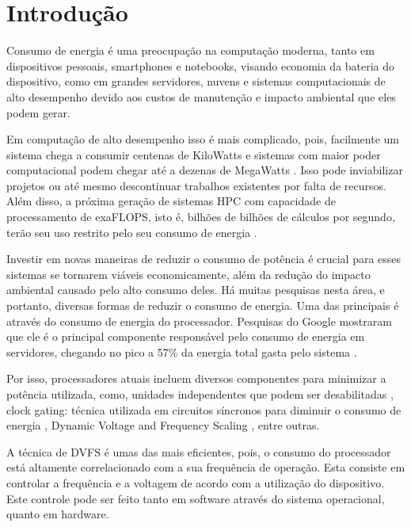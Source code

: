 \chapter{Introdução} \label{cap:introducao}

Consumo de energia é uma preocupação na computação moderna, tanto em dispositivos pessoais, smartphones e notebooks, visando economia da bateria do dispositivo, como em grandes servidores, nuvens e sistemas computacionais de alto desempenho devido aos custos de manutenção e impacto ambiental que eles podem gerar.

Em computação de alto desempenho  isso é mais complicado, pois, facilmente um sistema chega a consumir centenas de KiloWatts e sistemas com maior poder computacional podem chegar até a dezenas de MegaWatts \cite{Top500}. Isso pode inviabilizar projetos ou até mesmo descontinuar trabalhos existentes por falta de recursos. Além disso, a próxima geração de sistemas HPC com capacidade de processamento de exaFLOPS, isto é, bilhões de bilhões de cálculos por segundo, terão seu uso restrito pelo seu consumo de energia \cite{Alfonso2013}.

Investir em novas maneiras de reduzir o consumo de potência é crucial para esses sistemas se tornarem viáveis economicamente, além da redução do impacto ambiental causado pelo alto consumo deles. Há muitas pesquisas nesta área, e portanto, diversas formas de reduzir o consumo de energia. Uma das principais é através do consumo de energia do processador. Pesquisas do Google \cite{Fan2007} mostraram que ele é o principal componente responsável pelo consumo de energia em servidores, chegando no pico a 57\% da energia total gasta pelo sistema \cite{Barroso2007}.

Por isso, processadores atuais incluem diversos componentes para minimizar a potência utilizada, como, unidades independentes que podem ser desabilitadas \cite{Rotem2012}, clock gating: técnica utilizada em circuitos síncronos para diminuir o consumo de energia \cite{Srinivasan2015}, Dynamic Voltage and Frequency Scaling \cite{Mittal2014} , entre outras.

A técnica de DVFS \cite{Hackenberg2015, Dzhagaryan2014, Hahnel2012, Basmadjian2012, Travers2015, Miyoshi2002, Anghel2011, Pietri2014, Spiga2006} é umas das mais eficientes, pois, o consumo do processador está altamente correlacionado com a sua frequência de operação. Esta consiste em controlar a frequência e a voltagem de acordo com a utilização do dispositivo. Este controle pode ser feito tanto em software através do sistema operacional, quanto em hardware.

